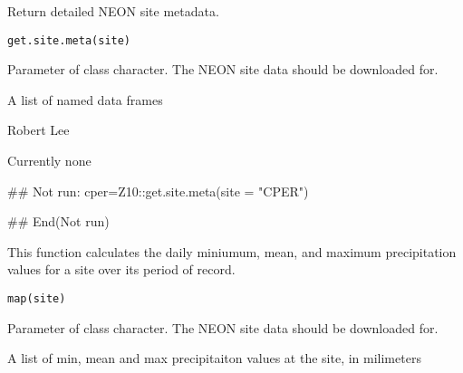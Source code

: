 \documentclass[a4paper]{book}
\begin{document}
%
\begin{Description}\relax
Return detailed NEON site metadata.
\end{Description}
%
\begin{Usage}
\begin{verbatim}
get.site.meta(site)
\end{verbatim}
\end{Usage}
%
\begin{Arguments}
\begin{ldescription}
\item[\code{site}] Parameter of class character.
The NEON site data should be downloaded for.
\end{ldescription}
\end{Arguments}
%
\begin{Value}
A list of named data frames
\end{Value}
%
\begin{Author}\relax
Robert Lee \\{}
\end{Author}
%
\begin{SeeAlso}\relax
Currently none
\end{SeeAlso}
%
\begin{Examples}
\begin{ExampleCode}
## Not run: 
cper=Z10::get.site.meta(site = "CPER")

## End(Not run)
\end{ExampleCode}
\end{Examples}
%
\begin{Description}\relax
This function calculates the daily miniumum, mean, and maximum
precipitation values for a site over its period of record.
\end{Description}
%
\begin{Usage}
\begin{verbatim}
map(site)
\end{verbatim}
\end{Usage}
%
\begin{Arguments}
\begin{ldescription}
\item[\code{site}] Parameter of class character.
The NEON site data should be downloaded for.
\end{ldescription}
\end{Arguments}
%
\begin{Value}
A list of min, mean and max precipitaiton
values at the site, in milimeters
\end{Value}
\end{document}

